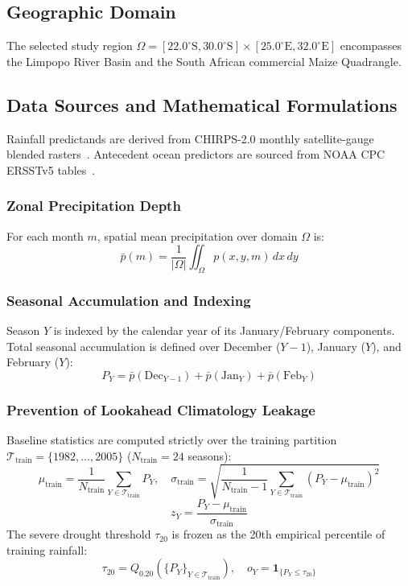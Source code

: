 \documentclass[runningheads]{llncs}
\begin{document}
\subsection{Geographic Domain}
The selected study region $\Omega = [22.0^\circ\text{S}, 30.0^\circ\text{S}] \times [25.0^\circ\text{E}, 32.0^\circ\text{E}]$ encompasses the Limpopo River Basin and the South African commercial Maize Quadrangle.

\subsection{Data Sources and Mathematical Formulations}
Rainfall predictands are derived from CHIRPS-2.0 monthly satellite-gauge blended rasters~\cite{funk2015chirps}. Antecedent ocean predictors are sourced from NOAA CPC ERSSTv5 tables~\cite{huang2017extended}.

\subsubsection{Zonal Precipitation Depth}
For each month $m$, spatial mean precipitation over domain $\Omega$ is:
\begin{equation}
    \bar{p}(m) = \frac{1}{|\Omega|} \iint_{\Omega} p(x, y, m) \, dx \, dy
\end{equation}

\subsubsection{Seasonal Accumulation and Indexing}
Season $Y$ is indexed by the calendar year of its January/February components. Total seasonal accumulation is defined over December ($Y-1$), January ($Y$), and February ($Y$):
\begin{equation}
    P_Y = \bar{p}(\text{Dec}_{Y-1}) + \bar{p}(\text{Jan}_Y) + \bar{p}(\text{Feb}_Y)
\end{equation}

\subsubsection{Prevention of Lookahead Climatology Leakage}
Baseline statistics are computed strictly over the training partition $\mathcal{T}_{\text{train}} = \{1982, \dots, 2005\}$ ($N_{\text{train}} = 24$ seasons):
\begin{equation}
    \mu_{\text{train}} = \frac{1}{N_{\text{train}}} \sum_{Y \in \mathcal{T}_{\text{train}}} P_Y, \quad
    \sigma_{\text{train}} = \sqrt{\frac{1}{N_{\text{train}}-1}\sum_{Y \in \mathcal{T}_{\text{train}}} (P_Y - \mu_{\text{train}})^2}
\end{equation}
\begin{equation}
    z_Y = \frac{P_Y - \mu_{\text{train}}}{\sigma_{\text{train}}}
\end{equation}
The severe drought threshold $\tau_{20}$ is frozen as the 20th empirical percentile of training rainfall:
\begin{equation}
    \tau_{20} = Q_{0.20}\left(\{P_Y\}_{Y \in \mathcal{T}_{\text{train}}}\right), \quad
    o_Y = \mathbf{1}_{\{P_Y \le \tau_{20}\}}
\end{equation}
\end{document}
